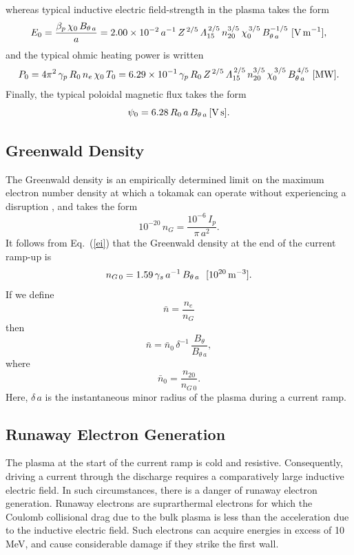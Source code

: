 \documentclass{iopjournal}
\providecommand{\DIFadd}[1]{{\protect\color{blue}\uwave{#1}}} %
\providecommand{\DIFaddbegin}{} %
\providecommand{\DIFaddend}{} %
\newcommand{\DIFaddincludegraphics}[2][]{{\color{blue}\fbox{\DIFOincludegraphics[#1]{#2}}}} %
\DeclareRobustCommand{\DIFaddbegin}{\DIFOaddbegin \let\includegraphics\DIFaddincludegraphics} %
\DeclareRobustCommand{\DIFaddend}{\DIFOaddend \let\includegraphics\DIFOincludegraphics} %
\begin{document}
 whereas typical inductive electric field-strength in the plasma takes the form
 \begin{equation}
 E_0 =\frac{\beta_p\,\chi_0\,B_{\theta\,a}}{a} = 2.00\times 10^{-2}\,a^{-1}\,Z^{\,2/5}\,{\mit\Lambda}_{15}^{\,2/5}\,n_{20}^{3/5}\,\chi_0^{\,3/5}\,B_{\theta\,a}^{-1/5}\,\,[{\rm V\,m}^{-1}],
 \end{equation}
 and the typical ohmic heating power is written
 \begin{equation}
 P_0 = 4\pi^2\,\gamma_p\,R_0\,n_e\,\chi_0\,T_0 = 6.29\times 10^{-1}\,\gamma_p\,R_0\,Z^{\,2/5}\,{\mit\Lambda}_{15}^{\,2/5}\,n_{20}^{3/5}\,\chi_0^{\,3/5}\,B_{\theta\,a}^{\,4/5}\,\,[{\rm MW}].
 \end{equation}
 Finally, the typical poloidal magnetic flux takes the form 
 \begin{equation}
 \psi_0= 6.28\,R_0\,a\,B_{\theta\,a}\,[{\rm V\,s}].
 \end{equation}

\subsection{Greenwald Density}
 The Greenwald density is an empirically determined limit on the maximum electron number density at which a tokamak can operate without experiencing a disruption \cite{green},
 and takes the form
 \begin{equation}
 10^{-20}\,n_{G} = \frac{10^{-6}\,I_{p}}{\pi\,a^2}.
 \end{equation}
 It follows from Eq.~(\ref{ei}) that the Greenwald density at the end of the  current ramp-up is
 \begin{equation}
 n_{G\,0} = 1.59\,\gamma_s \,a^{-1}\,B_{\theta\,a}~~[10^{20}\,{\rm m}^{-3}].
 \end{equation}
 If we define
 \begin{equation}\DIFaddbegin \label{e26c}
 \DIFaddend \bar{n} = \frac{n_e}{n_{G}}
 \end{equation}
 then 
 \begin{equation}
 \bar{n} = \bar{n}_0\,\delta^{-1}\,\frac{B_{\theta}}{B_{\theta\,a}},
  \end{equation}
  where
  \begin{equation}
  \bar{n}_0 = \frac{n_{20}}{n_{G\,0}}.
  \end{equation}
  Here, $\delta\,a$ is the instantaneous minor radius of the plasma during a current ramp. 

 
\subsection{Runaway Electron Generation}
 The plasma at the start of the current ramp is cold and resistive. Consequently, driving a current through the discharge requires a comparatively large inductive electric field. In such 
 circumstances, there is a danger of runaway electron generation. Runaway electrons are suprarthermal electrons for which the Coulomb collisional drag due to the bulk plasma is
 less than the acceleration due to the inductive electric field. Such electrons can acquire energies in excess of 10 MeV, and  \DIFaddbegin \DIFadd{can }\DIFaddend cause considerable damage if they strike the 
 first wall. 
\end{document}
